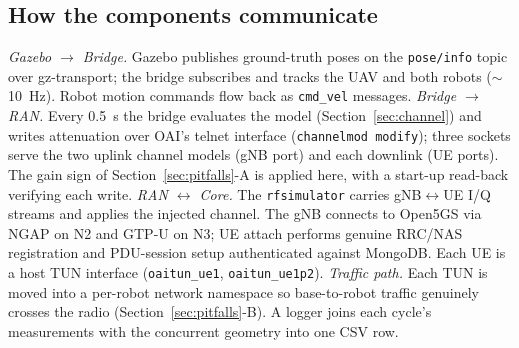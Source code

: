 \documentclass[10pt, conference]{IEEEtran}
\begin{document}
\subsection{How the components communicate}
\emph{Gazebo $\rightarrow$ Bridge.} Gazebo publishes ground-truth poses on the \texttt{pose/info} topic over gz-transport; the bridge subscribes and tracks the UAV and both robots ($\sim$10~Hz). Robot motion commands flow back as \texttt{cmd\_vel} messages.
\emph{Bridge $\rightarrow$ RAN.} Every 0.5~s the bridge evaluates the model (Section~\ref{sec:channel}) and writes attenuation over OAI's telnet interface (\texttt{channelmod modify}); three sockets serve the two uplink channel models (gNB port) and each downlink (UE ports). The gain sign of Section~\ref{sec:pitfalls}-A is applied here, with a start-up read-back verifying each write.
\emph{RAN $\leftrightarrow$ Core.} The \texttt{rfsimulator} carries gNB$\leftrightarrow$UE I/Q streams and applies the injected channel. The gNB connects to Open5GS via NGAP on N2 and GTP-U on N3; UE attach performs genuine RRC/NAS registration and PDU-session setup authenticated against MongoDB. Each UE is a host TUN interface (\texttt{oaitun\_ue1}, \texttt{oaitun\_ue1p2}).
\emph{Traffic path.} Each TUN is moved into a per-robot network namespace so base-to-robot traffic genuinely crosses the radio (Section~\ref{sec:pitfalls}-B). A logger joins each cycle's measurements with the concurrent geometry into one CSV row.
\end{document}
